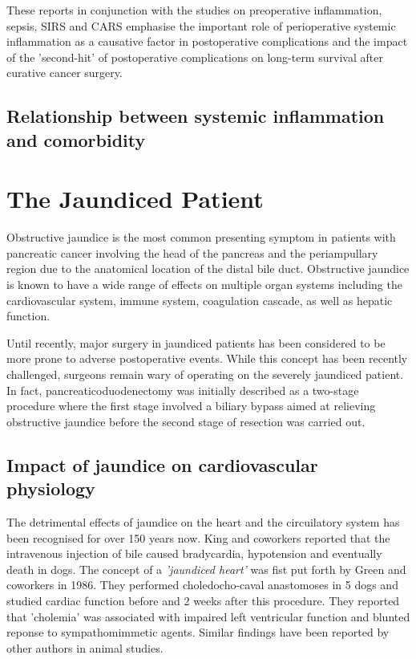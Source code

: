 These reports in conjunction with the studies on preoperative inflammation, sepsis, SIRS and CARS emphasise the important role of perioperative systemic inflammation as a causative factor in postoperative complications and the impact of the 'second-hit' of postoperative complications on long-term survival after curative cancer surgery.

\subsection{Relationship between systemic inflammation and comorbidity}

\section{The Jaundiced Patient}

Obstructive jaundice is the most common presenting symptom in patients with pancreatic cancer involving the head of the pancreas and the periampullary region due to the anatomical location of the distal bile duct. Obstructive jaundice is known to have a wide range of effects on multiple organ systems including the cardiovascular system, immune system, coagulation cascade, as well as hepatic function.

Until recently, major surgery in jaundiced patients has been considered to be more prone to adverse postoperative events. While this concept has been recently challenged, surgeons remain wary of operating on the severely jaundiced patient. In fact, pancreaticoduodenectomy was initially described as a two-stage procedure where the first stage involved a biliary bypass aimed at relieving obstructive jaundice before the second stage of resection was carried out.


\subsection{Impact of jaundice on cardiovascular physiology}

The detrimental effects of jaundice on the heart and the circuilatory system has been recognised for over 150 years now. King and coworkers reported that the intravenous injection of bile caused bradycardia, hypotension and eventually death in dogs.\parencite{king_effect_1909} The concept of a \textit{'jaundiced heart'} was fist put forth by Green and coworkers in 1986.\parencite{green_jaundiced_1986} They performed choledocho-caval anastomoses in 5 dogs and studied cardiac function before and 2 weeks after this procedure. They reported that 'cholemia' was associated with impaired left ventricular function and blunted reponse to sympathomimmetic agents. Similar findings have been reported by other authors in animal studies. \parencite{binah_obstructive_1985,bomzon_systemic_1986}

